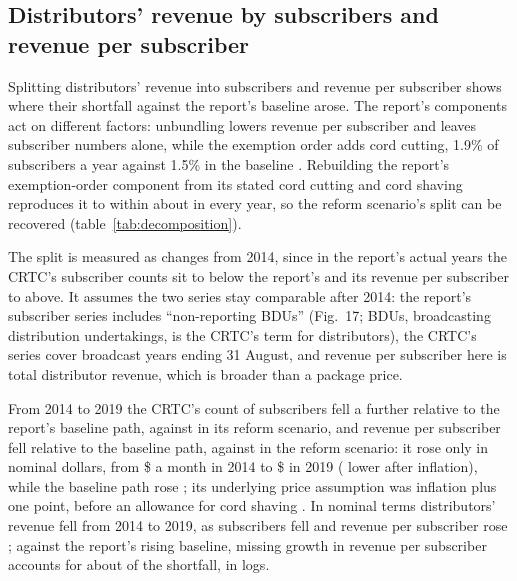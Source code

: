 \subsection{Distributors' revenue by subscribers and revenue per subscriber}

Splitting distributors' revenue into subscribers and revenue per subscriber shows where their shortfall against the report's baseline arose. The report's components act on different factors: unbundling lowers revenue per subscriber and leaves subscriber numbers alone, while the exemption order adds cord cutting, 1.9\% of subscribers a year against 1.5\% in the baseline \citep[paras.~204--205, 216, 220; Tables~5, 21]{nordicity2015television}. Rebuilding the report's exemption-order component from its stated cord cutting and cord shaving reproduces it to within about \lttvDecCheckMaxDev{} in every year, so the reform scenario's split can be recovered (table~\ref{tab:decomposition}).

The split is measured as changes from 2014, since in the report's actual years the CRTC's subscriber counts sit \lttvDecSubAlignLo{} to \lttvDecSubAlignHi{} below the report's and its revenue per subscriber \lttvDecPerAlignLo{} to \lttvDecPerAlignHi{} above. It assumes the two series stay comparable after 2014: the report's subscriber series includes \enquote{non-reporting BDUs} (Fig.~17; BDUs, broadcasting distribution undertakings, is the CRTC's term for distributors), the CRTC's series cover broadcast years ending 31 August, and revenue per subscriber here is total distributor revenue, which is broader than a package price.

From 2014 to 2019 the CRTC's count of subscribers fell a further \lttvDecSubObs{} relative to the report's baseline path, against \lttvDecSubFc{} in its reform scenario, and revenue per subscriber fell \lttvDecPerObs{} relative to the baseline path, against \lttvDecPerFc{} in the reform scenario: it rose only \lttvRevPerSubObsGrowth{} in nominal dollars, from \$\lttvRevPerSubFourteen{} a month in 2014 to \$\lttvRevPerSubNineteen{} in 2019 (\lttvRevPerSubRealFall{} lower after inflation), while the baseline path rose \lttvRevPerSubBaseGrowth{}; its underlying price assumption was inflation plus one point, before an allowance for cord shaving \citep[Table~11, paras.~151--152]{nordicity2015television}. In nominal terms distributors' revenue fell \lttvBDURevFallFourteenNineteen{} from 2014 to 2019, as subscribers fell \lttvSubsFallFourteenNineteen{} and revenue per subscriber rose \lttvRevPerSubObsGrowth{}; against the report's rising baseline, missing growth in revenue per subscriber accounts for about \lttvDecPerShare{} of the shortfall, in logs.

